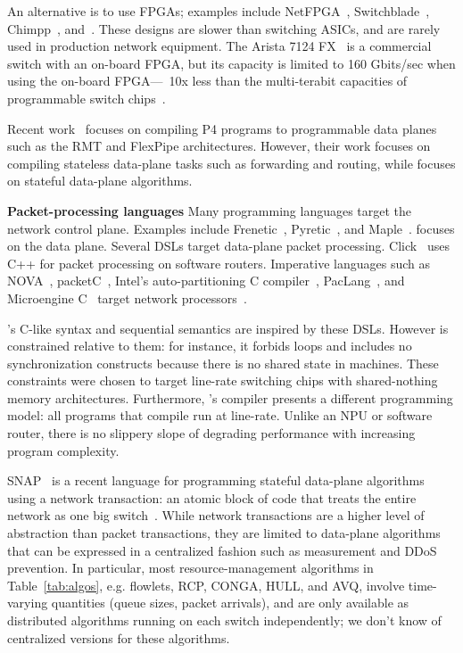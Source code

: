 An alternative is to use FPGAs; examples include NetFPGA~\cite{netfpga},
Switchblade~\cite{switchblade}, Chimpp~\cite{chimpp}, and~\cite{silver_bullet}.
These designs are slower than switching ASICs, and are rarely used in
production network equipment. The Arista 7124 FX~\cite{7124fx} is a commercial
switch with an on-board FPGA, but its capacity is limited to 160 Gbits/sec when
using the on-board FPGA---~10x less than the multi-terabit capacities of
programmable switch chips~\cite{xpliant}.

Recent work~\cite{lavanya_compiler} focuses on compiling P4 programs to
programmable data planes such as the RMT and FlexPipe architectures. However,
their work focuses on compiling stateless data-plane tasks such as forwarding
and routing, while \pktlanguage focuses on stateful data-plane algorithms.

\textbf{Packet-processing languages}
Many programming languages target the network control plane. Examples include
Frenetic~\cite{frenetic}, Pyretic~\cite{pyretic}, and Maple~\cite{maple}.
\pktlanguage focuses on the data plane. Several DSLs target data-plane packet
processing. Click~\cite{click} uses C++ for packet processing on software
routers. Imperative languages such as NOVA~\cite{nova}, packetC~\cite{packetc},
Intel's auto-partitioning C compiler~\cite{intel_uiuc_pldi},
PacLang~\cite{paclang_lang, paclang_partitioner}, and Microengine
C~\cite{microenginec, intel_ixa} target network processors~\cite{ixp2800,
ixp4xx}.

\pktlanguage's C-like syntax and sequential semantics are inspired by these
DSLs. However \pktlanguage is constrained relative to them: for instance, it
forbids loops and includes no synchronization constructs because there is no
shared state in \absmachine machines. These constraints were chosen to target
line-rate switching chips with shared-nothing memory architectures.
Furthermore, \pktlanguage's compiler presents a different programming model:
all \pktlanguage programs that compile run at line-rate. Unlike an NPU or
software router, there is no slippery slope of degrading performance with
increasing program complexity.

SNAP~\cite{snap} is a recent language for programming stateful data-plane
algorithms using a network transaction: an atomic block of code that treats the
entire network as one big switch~\cite{onebigswitch}. While network
transactions are a higher level of abstraction than packet transactions, they
are limited to data-plane algorithms that can be expressed in a centralized
fashion such as measurement and DDoS prevention. In particular, most
resource-management algorithms in Table~\ref{tab:algos}, e.g. flowlets, RCP,
CONGA, HULL, and AVQ, involve time-varying quantities (queue sizes, packet
arrivals), and are only available as distributed algorithms running on each
switch independently; we don't know of centralized versions for these
algorithms.

